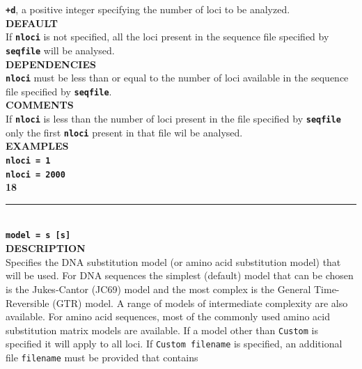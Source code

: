 \documentclass[a4paper]{book}
\numberwithin{equation}{section} \renewcommand{\baselinestretch}{0.55}
\begin{document}
\textbf{\texttt{+d}}, a positive integer specifying the number of loci to be analyzed. \vspace{5pt}\\
\textbf{DEFAULT} \vspace{5pt}\\
If \textbf{\texttt{nloci}} is not specified, all the loci present in the sequence file specified by \textbf{\texttt{seqfile}} will be analysed. \vspace{5pt}\\
\textbf{DEPENDENCIES} \vspace{5pt}\\
\textbf{\texttt{nloci}} must be less than or equal to the number of loci available in the sequence file specified by \textbf{\texttt{seqfile}}.  \vspace{5pt}\\
\textbf{COMMENTS} \vspace{5pt}\\
If \textbf{\texttt{nloci}} is less than the number of loci present in
the file specified by \textbf{\texttt{seqfile}} only the first
\textbf{\texttt{nloci}} present
in that file wil be analysed. \vspace{5pt}\\
\textbf{EXAMPLES} \vspace{5pt}\\
\textbf{\texttt{nloci = 1}} \vspace{5pt}\\
\textbf{\texttt{nloci = 2000}}\vspace{10pt}\\
\textbf{{\large 18}} \\
\noindent\rule{\textwidth}{0.8pt} \\
\textbf{{\Large \texttt{model = s [s]}}} \vspace{5pt}\\
\textbf{DESCRIPTION} \vspace{5pt}\\
Specifies the DNA substitution model (or amino acid substitution model) that will be used. For DNA sequences
the simplest (default) model that can be chosen is the Jukes-Cantor (JC69) model and the most complex is the
General Time-Reversible (GTR) model. A range of models of intermediate complexity are also available. For
amino acid sequences, most of the commonly used amino acid substitution matrix models are available. If a model other than \texttt{Custom}
is specified it will apply to all loci. If \texttt{Custom filename} is specified, an additional file \texttt{filename} must be provided that contains
\end{document}
